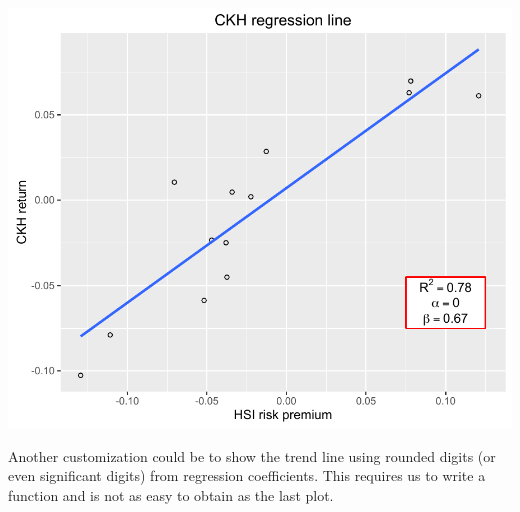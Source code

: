 \documentclass[]{article}
\begin{document}
\begin{center}\includegraphics{11_Linear_Regression_Plot_pdf/lr_12-1} \end{center}

Another customization could be to show the trend line using rounded
digits (or even significant digits) from regression coefficients. This
requires us to write a function and is not as easy to obtain as the last
plot.
\end{document}
